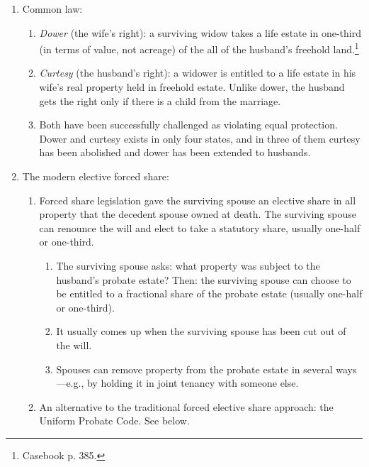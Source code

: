 \begin{enumerate}
    \item Common law:
    \begin{enumerate}
        \item \emph{Dower} (the wife's right): a surviving widow takes a life 
        estate in one-third (in terms of value, not acreage) of the all of the 
        husband's freehold land.\footnote{Casebook p. 385.}
        \item \emph{Curtesy} (the husband's right): a widower is entitled to a 
        life estate in his wife's real property held in freehold estate. 
        Unlike dower, the husband gets the right only if there is a child from 
        the marriage.
        \item Both have been successfully challenged as violating equal 
        protection. Dower and curtesy exists in only four states, and in three 
        of them curtesy has been abolished and dower has been extended to 
        husbands.
    \end{enumerate}
    \item The modern elective forced share:
    \begin{enumerate}
        \item Forced share legislation gave the surviving spouse an elective 
        share in all property that the decedent spouse owned at death. 
        The surviving spouse can renounce the will and elect to take a 
        statutory share, usually one-half or one-third.
        \begin{enumerate}
            \item The surviving spouse asks: what property was subject to the 
            husband's probate estate? Then: the surviving spouse can choose to 
            be entitled to a fractional share of the probate estate (usually 
            one-half or one-third).
            \item It usually comes up when the surviving spouse has been cut 
            out of the will.
            \item Spouses can remove property from the probate estate in 
            several ways---e.g., by holding it in joint tenancy with someone 
            else.
        \end{enumerate}
        \item An alternative to the traditional forced elective share 
        approach: the Uniform Probate Code. See below.
    \end{enumerate}
\end{enumerate}

